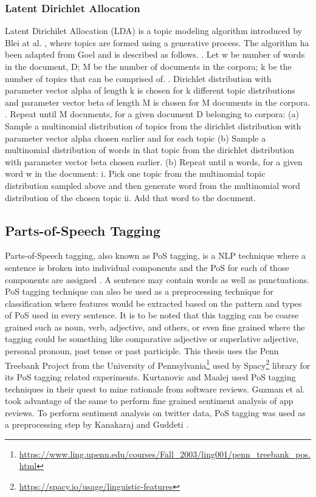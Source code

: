 \documentclass[a4paper,12pt,twoside]{report}
\begin{document}
\subsubsection{Latent Dirichlet Allocation}
Latent Dirichilet Allocation (LDA) is a topic modeling algorithm introduced by Blei at al. \cite{Blei2003}, where topics are formed using a generative process. The algorithm ha been adapted from Goel \cite{Goel2017} and is described as follows.
. Let w be number of words in the document, D; M be the number of documents in the corpora; k be the number of topics that can be comprised of. 
. Dirichlet distribution with parameter vector alpha of length k is chosen for k different topic distributions and parameter vector beta of length M is chosen for M documents in the corpora.
. Repeat until M documents, for a given document D belonging to corpora:
\bigbreak
(a) Sample a multinomial distribution of topics from the dirichlet distribution with parameter vector alpha chosen earlier and for each topic
\bigbreak
(b) Sample a multinomial distribution of words in that topic from the dirichlet distribution with parameter vector beta chosen earlier.
\bigbreak
(b) Repeat until n words, for a given word w in the document:
\bigbreak
i. Pick one topic from the multinomial topic distribution sampled above and then generate word from the multinomial word distribution of the chosen topic 
\bigbreak
ii. Add that word to the document.

\subsection{Parts-of-Speech Tagging}
Parts-of-Speech tagging, also known as PoS tagging, is a NLP technique where a sentence is broken into individual components and the PoS for each of those components are assigned \cite{Jurafsky2017}. A sentence may contain words as well as punctuations. PoS tagging technique can also be used as a preprocessing technique for classification where features would be extracted based on the pattern and types of PoS used in every sentence. It is to be noted that this tagging can be coarse grained such as noun, verb, adjective, and others, or even fine grained where the tagging could be something like comparative adjective or superlative adjective, personal pronoun, past tense or past participle. This thesis uses the Penn Treebank Project from the University of Pennsylvania\footnote{\url{https://www.ling.upenn.edu/courses/Fall_2003/ling001/penn_treebank_pos.html}} used by Spacy\footnote{\url{https://spacy.io/usage/linguistic-features}} library for its PoS tagging related experiments.
\bigbreak
Kurtanovic and Maalej \cite{Kurtanovic2017} used PoS tagging techniques in their quest to mine rationale from software reviews. Guzman et al.\cite{Guzman2015} took advantage of the same to perform fine grained sentiment analysis of app reviews. To perform sentiment analysis on twitter data, PoS tagging was used as a preprocessing step by Kanakaraj and Guddeti \cite{Kanakaraj2015}.
\end{document}
